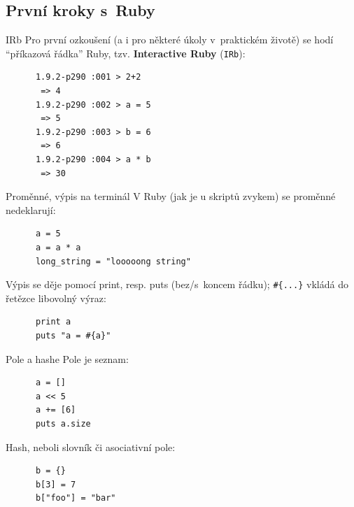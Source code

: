 \documentclass{beamer}
\begin{document}
\subsection{První kroky s~Ruby}

\begin{frame}[fragile]{IRb}
  Pro první ozkoušení (a i pro některé úkoly v~praktickém životě) se hodí ``příkazová řádka'' Ruby, tzv. \textbf{Interactive Ruby} (\texttt{IRb}):
  \pause
  \begin{block}{}
    {\scriptsize \begin{verbatim}
      1.9.2-p290 :001 > 2+2
       => 4
      1.9.2-p290 :002 > a = 5
       => 5
      1.9.2-p290 :003 > b = 6
       => 6
      1.9.2-p290 :004 > a * b
       => 30
    \end{verbatim}}
  \end{block}

\end{frame}

\begin{frame}[fragile]{Proměnné, výpis na terminál}
  V Ruby (jak je u skriptů zvykem) se proměnné nedeklarují:
  \begin{block}{}
    {\scriptsize \begin{verbatim}
      a = 5
      a = a * a
      long_string = "looooong string"
    \end{verbatim}}
  \end{block}
  \pause
  Výpis se děje pomocí print, resp. puts (bez/s~koncem řádku); \texttt{\#\{...\}} vkládá do řetězce libovolný výraz:
  \begin{block}{}
    {\scriptsize \begin{verbatim}
      print a
      puts "a = #{a}"
    \end{verbatim}}
  \end{block}
\end{frame}

\begin{frame}[fragile]{Pole a hashe}
  Pole je seznam:
  \begin{block}{}
    {\scriptsize \begin{verbatim}
      a = []
      a << 5
      a += [6]
      puts a.size
    \end{verbatim}}
  \end{block}
  \pause
  Hash, neboli slovník či asociativní pole:
  \begin{block}{}
    {\scriptsize \begin{verbatim}
      b = {}
      b[3] = 7
      b["foo"] = "bar"
    \end{verbatim}}
  \end{block}
\end{frame}
\end{document}
